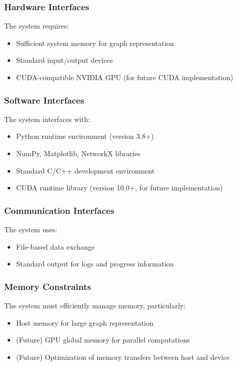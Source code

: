 \documentclass[conference]{IEEEtran}
\begin{document}
\subsubsection{Hardware Interfaces}
The system requires:
\begin{itemize}
    \item Sufficient system memory for graph representation
    \item Standard input/output devices
    \item CUDA-compatible NVIDIA GPU (for future CUDA implementation)
\end{itemize}

\subsubsection{Software Interfaces}
The system interfaces with:
\begin{itemize}
    \item Python runtime environment (version 3.8+)
    \item NumPy, Matplotlib, NetworkX libraries
    \item Standard C/C++ development environment
    \item CUDA runtime library (version 10.0+, for future implementation)
\end{itemize}

\subsubsection{Communication Interfaces}
The system uses:
\begin{itemize}
    \item File-based data exchange
    \item Standard output for logs and progress information
\end{itemize}

\subsubsection{Memory Constraints}
The system must efficiently manage memory, particularly:
\begin{itemize}
    \item Host memory for large graph representation
    \item (Future) GPU global memory for parallel computations
    \item (Future) Optimization of memory transfers between host and device
\end{itemize}
\end{document}

